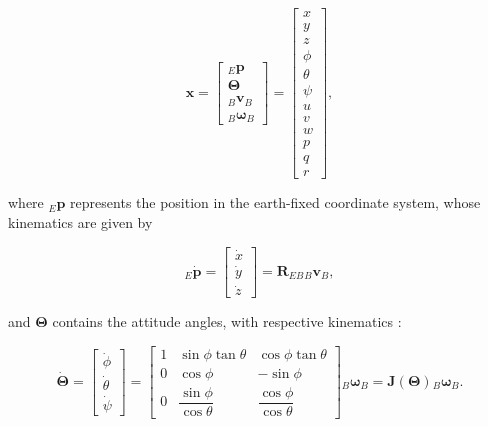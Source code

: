 \begin{equation}
	\bm{x}
	=
	\begin{bmatrix}
		{}_E \bm{p} \\
		\bm{\Theta} \\
		{}_B \bm{v}_B \\
		{}_B \bm{\omega}_B
	\end{bmatrix}
	=
	\begin{bmatrix}
		x \\ y \\ z \\ \phi \\ \theta \\ \psi \\ u \\ v \\ w \\  p \\ q \\ r
	\end{bmatrix},
\end{equation}

where ${}_E \bm{p}$ represents the position in the earth-fixed coordinate system, whose kinematics are given by

\begin{equation}
	{}_E \dot{\bm{p}}
	=
	\begin{bmatrix}
		\dot{x} \\ \dot{y} \\ \dot{z}
	\end{bmatrix}
	=
	\bm{R}_{EB} {}_B \bm{v}_B,
\end{equation}

and $\bm{\Theta}$ contains the attitude angles, with respective kinematics \cite{Fossen2021Handbook}:

\begin{equation}
	\dot{\bm{\Theta}}
	=
	\begin{bmatrix} 
		\dot{\phi} \\ \dot{\theta} \\ \dot{\psi} 
	\end{bmatrix}
	=
	\begin{bmatrix}
		1 & \sin\phi\tan\theta & \cos\phi\tan\theta \\
		0 & \cos\phi & -\sin\phi \\
		0 & \dfrac{\sin\phi}{\cos\theta} & \dfrac{\cos\phi}{\cos\theta}
	\end{bmatrix}
	{}_B \bm{\omega}_B
	=
	\bm{J}(\bm{\Theta}) {}_B \bm{\omega}_B.
\end{equation}

